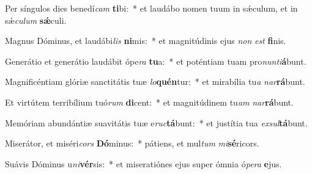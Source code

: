 \item Per síngulos dies benedí\textit{cam} \textbf{ti}bi:~* et laudábo nomen tuum in sǽculum, et in sǽ\textit{cu}\textit{lum} \textbf{sǽ}culi.
\item Magnus Dóminus, et laudábi\textit{lis} \textbf{ni}mis:~* et magnitúdinis ejus \textit{non} \textit{est} \textbf{fi}nis.
\item Generátio et generátio laudábit ópe\textit{ra} \textbf{tu}a:~* et poténtiam tuam pro\textit{nun}\textit{ti}\textbf{á}bunt.
\item Magnificéntiam glóriæ sanctitátis tuæ \textit{lo}\textbf{quén}tur:~* et mirabília tu\textit{a} \textit{nar}\textbf{rá}bunt.
\item Et virtútem terribílium tuó\textit{rum} \textbf{di}cent:~* et magnitúdinem tu\textit{am} \textit{nar}\textbf{rá}bunt.
\item Memóriam abundántiæ suavitátis tuæ e\textit{ruc}\textbf{tá}bunt:~* et justítia tua \textit{ex}\textit{sul}\textbf{tá}bunt.
\item Miserátor, et miséri\textit{cors} \textbf{Dó}minus:~* pátiens, et mul\textit{tum} \textit{mi}\textbf{sé}ricors.
\item Suávis Dóminus u\textit{ni}\textbf{vér}sis:~* et miseratiónes ejus super ómnia ó\textit{pe}\textit{ra} \textbf{e}jus.
